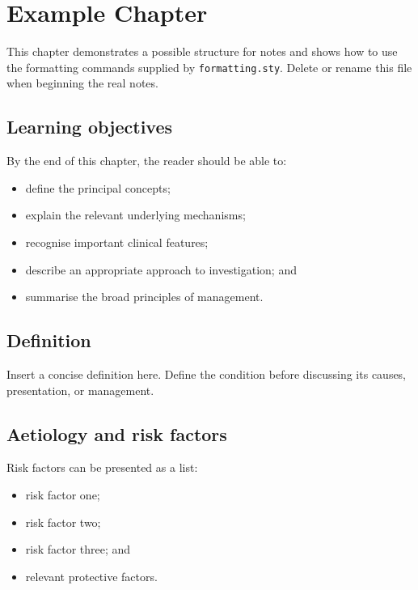 \chapter{Example Chapter}
\label{ch:example}

\begin{chapteroverview}
This chapter demonstrates a possible structure for notes and shows how
to use the formatting commands supplied by \texttt{formatting.sty}.
Delete or rename this file when beginning the real notes.
\end{chapteroverview}

\section{Learning objectives}

By the end of this chapter, the reader should be able to:

\begin{itemize}
    \item define the principal concepts;
    \item explain the relevant underlying mechanisms;
    \item recognise important clinical features;
    \item describe an appropriate approach to investigation; and
    \item summarise the broad principles of management.
\end{itemize}

\section{Definition}

\begin{definitionbox}
Insert a concise definition here. Define the condition before
discussing its causes, presentation, or management.
\end{definitionbox}

\section{Aetiology and risk factors}

Risk factors can be presented as a list:

\begin{itemize}
    \item risk factor one;
    \item risk factor two;
    \item risk factor three; and
    \item relevant protective factors.
\end{itemize}

